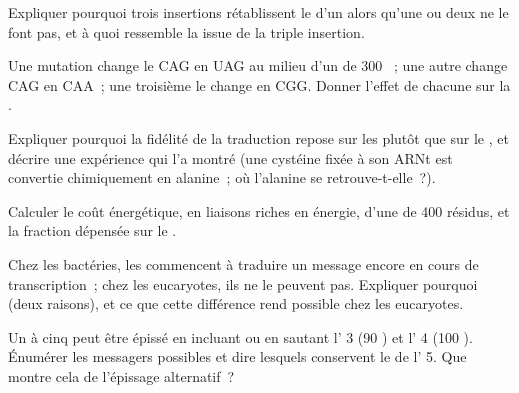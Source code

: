 \begin{exercise}[$\star\star$]\label{exo:b1:gene-expression:6}
Expliquer pourquoi trois insertions rétablissent le 
d'un  alors qu'une ou deux ne le font pas, et à quoi ressemble la
 issue de la triple insertion.
\end{exercise}

\begin{exercise}[$\star\star$]\label{exo:b1:gene-expression:7}
Une mutation change le  CAG en UAG au milieu d'un  de
\qty{300}{} ~; une autre change CAG en CAA~; une troisième le
change en CGG. Donner l'effet de chacune sur la .
\end{exercise}

\begin{exercise}[$\star\star$]\label{exo:b1:gene-expression:8}
Expliquer pourquoi la fidélité de la traduction repose sur les
 plutôt que sur le , et décrire une
expérience qui l'a montré (une cystéine fixée à son ARNt est convertie
chimiquement en alanine~; où l'alanine se retrouve-t-elle~?).
\end{exercise}

\begin{exercise}[$\star\star$]\label{exo:b1:gene-expression:9}
Calculer le coût énergétique, en liaisons riches en énergie, d'une
 de \qty{400}{} résidus, et la fraction dépensée sur le
.
\end{exercise}

\begin{exercise}[$\star\star\star$]\label{exo:b1:gene-expression:10}
Chez les bactéries, les  commencent à traduire un message
encore en cours de transcription~; chez les eucaryotes, ils ne le
peuvent pas. Expliquer pourquoi (deux raisons), et ce que cette
différence rend possible chez les eucaryotes.
\end{exercise}

\begin{exercise}[$\star\star\star$]\label{exo:b1:gene-expression:11}
Un  à cinq  peut être épissé en incluant ou en sautant l' 3
(\qty{90}{} ) et l' 4 (\qty{100}{} ).
Énumérer les messagers possibles et dire lesquels conservent le  de l' 5. Que montre cela de l'épissage alternatif~?
\end{exercise}

